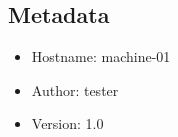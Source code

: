 \documentclass[11pt]{report}
\begin{document}
\chapter{}

\section{Metadata}

\begin{itemize}
  \item Hostname: machine-01
  \item Author: tester
  \item Version: 1.0
\end{itemize}
\end{document}
